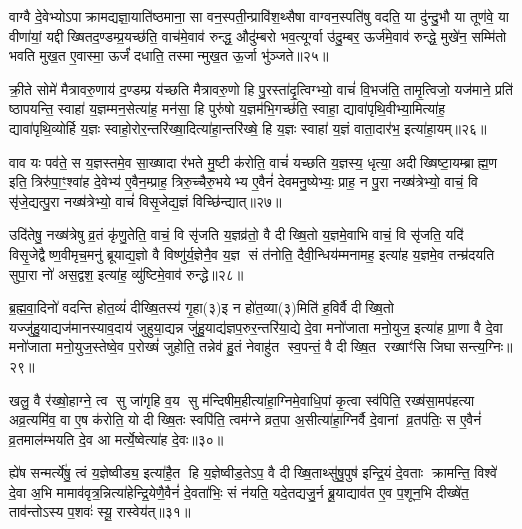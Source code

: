 {\anuvakamend[{रु॒न्ध॒ ए॒ष तस्माच्छर॒मयी॒ यूप॒स्तृती॑यम्मिथुन॒त्वाय॒ जन्म॒ हस्ते॑ना॒ष्टाच॑त्वारिशच्च॥३॥}]}

वाग्वै दे॒वेभ्योऽपाक्रामद्यज्ञा॒याति॑ष्ठमाना॒ सा वन॒स्पती॒न्प्रावि॑श॒थ्सैषा वाग्वन॒स्पति॑षु वदति॒ या दु॑न्दु॒भौ या तूण॑वे॒ या वीणा॑यां॒ यद्दीख्षितद॒ण्डम्प्र॒यच्छ॑ति॒ वाच॑मे॒वाव॑ रुन्द्ध॒ औदु॑म्बरो भव॒त्यूर्ग्वा उ॑दु॒म्बर॒ ऊर्ज॑मे॒वाव॑ रुन्द्धे॒ मुखे॑न॒ सम्मि॑तो भवति मुख॒त ए॒वास्मा॒ ऊर्जं॑ दधाति॒ तस्मान्मुख॒त ऊ॒र्जा भु॑ञ्जते॥२५॥

क्री॒ते सोमे॑ मैत्रावरु॒णाय॑ द॒ण्डम्प्र य॑च्छति मैत्रावरु॒णो हि पु॒रस्ता॑दृ॒त्विग्भ्यो॒ वाचं॑ वि॒भज॑ति॒ तामृ॒त्विजो॒ यज॑माने॒ प्रति॑ ष्ठापयन्ति॒ स्वाहा॑ य॒ज्ञम्मन॒सेत्या॑ह॒ मन॑सा॒ हि पुरु॑षो य॒ज्ञम॑भि॒गच्छ॑ति॒ स्वाहा॒ द्यावा॑पृथि॒वीभ्या॒मित्या॑ह॒ द्यावा॑पृथि॒व्योर्\mbox{}हि य॒ज्ञः स्वाहो॒रोर॒न्तरि॑ख्षा॒दित्या॑हा॒न्तरि॑ख्षे॒ हि य॒ज्ञः स्वाहा॑ य॒ज्ञं वाता॒दार॑भ॒ इत्या॑हा॒यम्॥२६॥

वाव यः पव॑ते॒ स य॒ज्ञस्तमे॒व सा॒ख्षादा र॑भते मु॒ष्टी क॑रोति॒ वाचं॑ यच्छति य॒ज्ञस्य॒ धृत्या॒ अदीख्षिष्टा॒यम्ब्राह्म॒ण इति॒ त्रिरु॑पा॒ꣳ॒श्वा॑ह दे॒वेभ्य॑ ए॒वैन॒म्प्राह॒ त्रिरु॒च्चैरु॒भयेभ्य ए॒वैनं॑ देवमनु॒ष्येभ्यः॒ प्राह॒ न पु॒रा नख्ष॑त्रेभ्यो॒ वाचं॒ वि सृ॑जे॒द्यत्पु॒रा नख्ष॑त्रेभ्यो॒ वाचं॑ विसृ॒जेद्य॒ज्ञं विच्छि॑न्द्यात्॥२७॥

उदि॑तेषु॒ नख्ष॑त्रेषु व्र॒तं कृ॑णु॒तेति॒ वाचं॒ वि सृ॑जति य॒ज्ञव्र॑तो॒ वै दीख्षि॒तो य॒ज्ञमे॒वाभि वाचं॒ वि सृ॑जति॒ यदि॑ विसृ॒जेद्वैष्ण॒वीमृच॒मनु॑ ब्रूयाद्य॒ज्ञो वै विष्णु॑र्य॒ज्ञेनै॒व य॒ज्ञ सं त॑नोति॒ दैवी॒न्धिय॑म्मनामह॒ इत्या॑ह य॒ज्ञमे॒व तन्म्र॑दयति सुपा॒रा नो॑ अस॒द्वश॒ इत्या॑ह॒ व्यु॑ष्टिमे॒वाव॑ रुन्द्धे॥२८॥

ब्र॒ह्म॒वा॒दिनो॑ वदन्ति होत॒व्यं॑ दीख्षि॒तस्य॑ गृ॒हा(३)इ न हो॑त॒व्या(३)मिति॑ ह॒विर्वै दीख्षि॒तो यज्जु॑हु॒याद्यज॑मानस्याव॒दाय॑ जुहुया॒द्यन्न जु॑हु॒याद्य॑ज्ञप॒रुर॒न्तरि॑या॒द्ये दे॒वा मनो॑जाता मनो॒युज॒ इत्या॑ह प्रा॒णा वै दे॒वा मनो॑जाता मनो॒युज॒स्तेष्वे॒व प॒रोख्षं॑ जुहोति॒ तन्नेव॑ हु॒तं नेवाहु॑त स्व॒पन्तं॒ वै दीख्षि॒त रख्षाꣳ॑सि जिघासन्त्य॒ग्निः॥२९॥

खलु॒ वै र॑ख्षो॒हाग्ने॒ त्व सु जा॑गृहि व॒य सु म॑न्दिषीम॒हीत्या॑हा॒ग्निमे॒वाधि॒पां कृ॒त्वा स्व॑पिति॒ रख्ष॑सा॒मप॑हत्या अव्र॒त्यमि॑व॒ वा ए॒ष क॑रोति॒ यो दीख्षि॒तः स्वपि॑ति॒ त्वम॑ग्ने व्रत॒पा अ॒सीत्या॑हा॒ग्निर्वै दे॒वानां व्र॒तप॑तिः॒ स ए॒वैनं॑ व्र॒तमाल॑म्भयति दे॒व आ मर्त्ये॒ष्वेत्या॑ह दे॒वः॥३०॥

ह्ये॑ष सन्मर्त्ये॑षु॒ त्वं य॒ज्ञेष्वीड्य॒ इत्या॑है॒त हि य॒ज्ञेष्वीड॒तेऽप॒ वै दीख्षि॒ताथ्सु॑षु॒पुष॑ इन्द्रि॒यं दे॒वताः क्रामन्ति॒ विश्वे॑ दे॒वा अ॒भि मामाव॑वृत्र॒न्नित्या॑हेन्द्रि॒येणै॒वैनं॑ दे॒वता॑भिः॒ सं न॑यति॒ यदे॒तद्यजु॒र्न ब्रू॒याद्याव॑त ए॒व प॒शून॒भि दीख्षे॑त॒ ताव॑न्तोऽस्य प॒शवः॑ स्यू॒ रास्वेय॑त्॥३१॥


